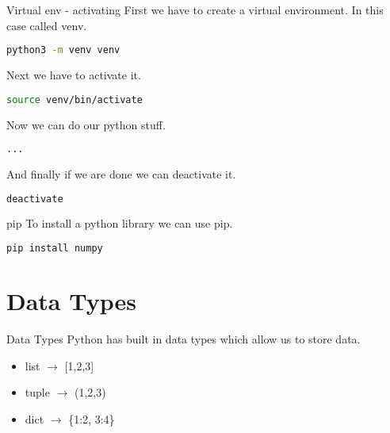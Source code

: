 \documentclass{beamer}
\begin{document}
\begin{frame}[fragile]{Virtual env - activating}
    First we have to create a virtual environment. In this case called venv.\\
    \begin{lstlisting}[backgroundcolor = \color{lightgray},language=bash]
        python3 -m venv venv
    \end{lstlisting}
    Next we have to activate it.\\
    \begin{lstlisting}[backgroundcolor = \color{lightgray},language=bash]
        source venv/bin/activate
    \end{lstlisting}
    Now we can do our python stuff.\\
    \begin{lstlisting}[backgroundcolor = \color{lightgray},language=bash]
        ...
    \end{lstlisting}
    And finally if we are done we can deactivate it.\\
    \begin{lstlisting}[backgroundcolor = \color{lightgray},language=bash]
        deactivate
    \end{lstlisting}

\end{frame}

\begin{frame}[fragile]{pip}
    To install a python library we can use pip.\\
    \pause
    \begin{lstlisting}[backgroundcolor = \color{lightgray},language=bash]
        pip install numpy
    \end{lstlisting}
\end{frame}


\section{Data Types}

\begin{frame}{Data Types}
    Python has built in data types which allow us to store data.\\

    \begin{itemize}
        \item list $\rightarrow$ [1,2,3]
        \item tuple $\rightarrow$ (1,2,3)
        \item dict $\rightarrow$ \{1:2, 3:4\}
    \end{itemize}
    
\end{frame}
\end{document}

